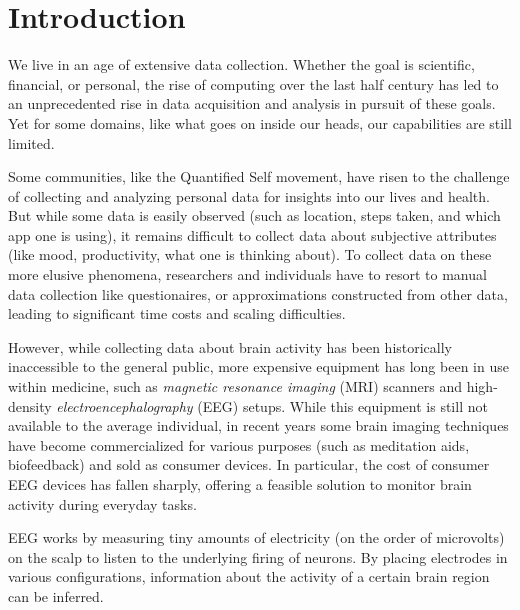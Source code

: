 \chapter{Introduction}



We live in an age of extensive data collection. Whether the goal is scientific, financial, or personal, the rise of computing over the last half century has led to an unprecedented rise in data acquisition and analysis in pursuit of these goals. Yet for some domains, like what goes on inside our heads, our capabilities are still limited.


Some communities, like the Quantified Self movement, have risen to the challenge of collecting and analyzing personal data for insights into our lives and health. But while some data is easily observed (such as location, steps taken, and which app one is using), it remains difficult to collect data about subjective attributes (like mood, productivity, what one is thinking about). To collect data on these more elusive phenomena, researchers and individuals have to resort to manual data collection like questionaires, or approximations constructed from other data, leading to significant time costs and scaling difficulties.


However, while collecting data about brain activity has been historically inaccessible to the general public, more expensive equipment has long been in use within medicine, such as \emph{magnetic resonance imaging} (MRI) scanners and high-density \emph{electroencephalography} (EEG) setups. While this equipment is still not available to the average individual, in recent years some brain imaging techniques have become commercialized for various purposes (such as meditation aids, biofeedback) and sold as consumer devices. In particular, the cost of consumer EEG devices has fallen sharply, offering a feasible solution to monitor brain activity during everyday tasks.

EEG works by measuring tiny amounts of electricity (on the order of microvolts) on the scalp to listen to the underlying firing of neurons. By placing electrodes in various configurations, information about the activity of a certain brain region can be inferred.

